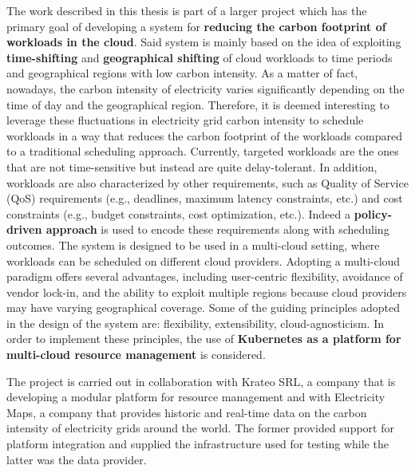 The work described in this thesis is part of a larger project which has the primary goal of developing a system for \textbf{reducing the carbon footprint of workloads in the cloud}.
Said system is mainly based on the idea of exploiting \textbf{time-shifting} and \textbf{geographical shifting} of cloud workloads to time periods and geographical regions with low carbon intensity.
As a matter of fact, nowadays, the carbon intensity of electricity varies significantly depending on the time of day and the geographical region.
Therefore, it is deemed interesting to leverage these fluctuations in electricity grid carbon intensity to schedule workloads in a way that reduces the carbon footprint of the workloads compared to a traditional scheduling approach.
Currently, targeted workloads are the ones that are not time-sensitive but instead are quite delay-tolerant.
In addition, workloads are also characterized by other requirements, such as Quality of Service (QoS) requirements (e.g., deadlines, maximum latency constraints, etc.) and cost constraints (e.g., budget constraints, cost optimization, etc.).
Indeed a \textbf{policy-driven approach} is used to encode these requirements along with scheduling outcomes.
The system is designed to be used in a multi-cloud setting, where workloads can be scheduled on different cloud providers.
Adopting a multi-cloud paradigm offers several advantages, including user-centric flexibility, avoidance of vendor lock-in, and the ability to exploit multiple regions because cloud providers may have varying geographical coverage.
Some of the guiding principles adopted in the design of the system are: flexibility, extensibility, cloud-agnosticism.
In order to implement these principles, the use of \textbf{Kubernetes as a platform for multi-cloud resource management} is considered. 

The project is carried out in collaboration with Krateo SRL, a company that is developing a modular platform for resource management and with Electricity Maps, a company that provides historic and real-time data on the carbon intensity of electricity grids around the world. 
The former provided support for platform integration and supplied the infrastructure used for testing while the latter was the data provider.
\newline


